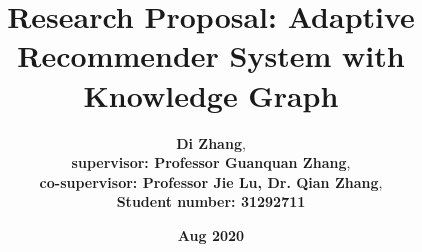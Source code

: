 \documentclass[12pt,a4 paper,title page]{article}
\title{Research Proposal: Adaptive Recommender System with Knowledge Graph}
\author{\large\textbf{Di Zhang}, \\
\textbf{supervisor: Professor Guanquan Zhang}, \\
\textbf{co-supervisor: Professor Jie Lu, Dr. Qian Zhang}, \\
\textbf{Student number: 31292711}}
\date{\Large{\textbf{Aug 2020}}}
\theoremstyle{definition}
\begin{document}
\sloppy
\maketitle

\tableofcontents
\newpage

















\clearpage
\end{document}
